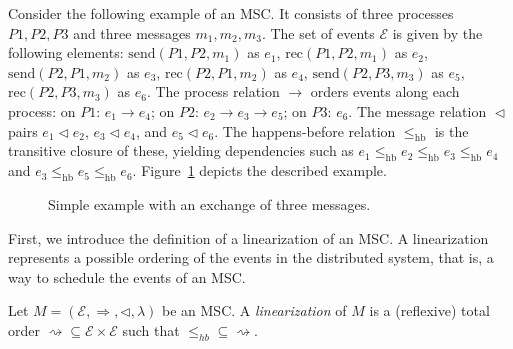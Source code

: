 \bigskip

\begin{example}\label{exmp:msc}
Consider the following example of an MSC.  
It consists of three processes $P1,P2,P3$ and three messages $m_1,m_2,m_3$.  
The set of events $\mathcal{E}$ is given by the following elements:  
$\mathrm{send}(P1,P2,m_1)$ as $e_1$,  
$\mathrm{rec}(P1,P2,m_1)$ as $e_2$,  
$\mathrm{send}(P2,P1,m_2)$ as $e_3$,  
$\mathrm{rec}(P2,P1,m_2)$ as $e_4$,  
$\mathrm{send}(P2,P3,m_3)$ as $e_5$,  
$\mathrm{rec}(P2,P3,m_3)$ as $e_6$.  
The process relation $\rightarrow$ orders events along each process:  
on $P1$: $e_1 \rightarrow e_4$;  
on $P2$: $e_2 \rightarrow e_3 \rightarrow e_5$;  
on $P3$: $e_6$.  
The message relation $\vartriangleleft$ pairs $e_1 \vartriangleleft e_2$,  
$e_3 \vartriangleleft e_4$, and $e_5 \vartriangleleft e_6$.  
The happens-before relation $\le_{\mathrm{hb}}$ is the transitive closure  
of these, yielding dependencies such as  
$e_1 \le_{\mathrm{hb}} e_2 \le_{\mathrm{hb}} e_3 \le_{\mathrm{hb}} e_4$  
and $e_3 \le_{\mathrm{hb}} e_5 \le_{\mathrm{hb}} e_6$.  
Figure~\ref{fig:msc-exmp} depicts the described example.
	
\begin{figure}[!ht]
\centering
\begin{msc}[draw frame=none, draw head=none, msc keyword=, head height=0px, label distance=0.5ex, foot height=0px, foot distance=0px]{}

	\nextlevel
	\nextlevel
\end{msc}
\caption{Simple example with an exchange of three messages.}
\label{fig:msc-exmp}
\end{figure}
\end{example}

First, we introduce the definition of a linearization of an MSC. A
linearization represents a possible ordering of the events in the distributed
system, that is, a way to schedule the events of an MSC.

\bigskip

\begin{definition}
	Let $M = (\mathcal{E}, \Rightarrow, \triangleleft, \lambda)$ be an MSC.
	A \emph{linearization} of $M$ is a (reflexive) total order
	$\rightsquigarrow \subseteq \mathcal{E} \times \mathcal{E}$ such that
	$\leq_{hb} \subseteq \rightsquigarrow$. 
\end{definition}

